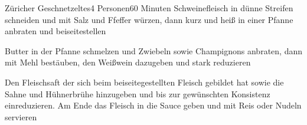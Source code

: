 
\begin{recipe}{Züricher Geschnetzeltes}{4 Personen}{60 Minuten}
Schweinefleisch in dünne Streifen schneiden und mit Salz und Ffeffer würzen, dann kurz und heiß in einer Pfanne anbraten und beiseitestellen

Butter in der Pfanne schmelzen und Zwiebeln sowie Champignons anbraten, dann mit Mehl bestäuben, den Weißwein dazugeben und stark reduzieren

Den Fleischsaft der sich beim beiseitegestellten Fleisch gebildet hat sowie die Sahne und Hühnerbrühe hinzugeben und bis zur gewünschten Konsistenz einreduzieren. Am Ende das Fleisch in die Sauce geben und mit Reis oder Nudeln servieren
\end{recipe}

